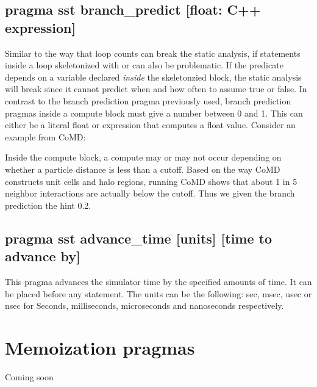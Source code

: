 \subsection{pragma sst branch\_predict [float: C++ expression]}
Similar to the way that loop counts can break the static analysis, if statements inside a loop skeletonized with  or  can also be problematic.
If the predicate depends on a variable declared \emph{inside} the skeletonzied block,
the static analysis will break since it cannot predict when and how often to assume true or false.
In contrast to the branch prediction pragma previously used, branch prediction pragmas inside a compute block must give a number between 0 and 1.
This can either be a literal float or expression that computes a float value.
Consider an example from CoMD:

\begin{CppCode}
#pragma sst branch_predict 0.2
  if(r2 <= rCut2 && r2 > 0.0){
\end{CppCode}
Inside the compute block, a compute may or may not occur depending on whether a particle distance is less than a cutoff.
Based on the way CoMD constructs unit cells and halo regions, running CoMD shows that about 1 in 5 neighbor interactions are actually below the cutoff.
Thus we given the branch prediction the hint 0.2.

\subsection{pragma sst advance\_time [units] [time to advance by]}
This pragma advances the simulator time by the specified amounts of time. It can be placed before any statement. The units can be the following: sec, msec, usec or nsec for Seconds, milliseconds, microseconds and nanoseconds respectively. 

\section{Memoization pragmas}
Coming soon